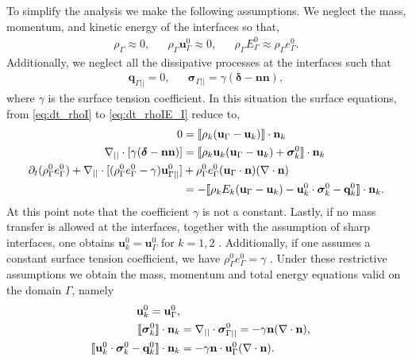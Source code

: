 To simplify the analysis we make the following assumptions. 
We neglect the mass, momentum, and kinetic energy of the interfaces so that,
\begin{align*}
    \rho_\Gamma \approx 0,
    &&
    \rho_\Gamma \textbf{u}_\Gamma^0 \approx 0,
    &&
    \rho_\Gamma E_\Gamma^0 \approx \rho_\Gamma e_\Gamma^0. 
\end{align*}
Additionally, we neglect all the dissipative processes at the interfaces such that
\begin{align*}
    \textbf{q}_{\Gamma||} = 0,
    &&
    \bm\sigma_{\Gamma||} = \gamma (\bm\delta  - \textbf{nn}),
\end{align*}
where $\gamma$ is the surface tension coefficient. 
In this situation the surface equations, from \ref{eq:dt_rhoI} to \ref{eq:dt_rhoIE_I} reduce to, 
\begin{align}
    0&= 
    \llbracket 
        \rho_k (\textbf{u}_\Gamma - \textbf{u}_k)
     \rrbracket \cdot \textbf{n}_k
    \\
    \mathbf{\nabla}_{||}\cdot [\gamma ( \bm\delta - \textbf{nn})]
    &= 
    \llbracket 
        \rho_k \textbf{u}_k (\textbf{u}_\Gamma - \textbf{u}_k)
        + \bm\sigma^0_k
     \rrbracket \cdot \textbf{n}_k
    \\
    \partial_t (\rho_\Gamma^0e_\Gamma^0)  
    + \mathbf{\nabla}_{||}\cdot [
        (\rho_\Gamma^0 e_\Gamma^0 - \gamma)
         \textbf{u}_{\Gamma||}^0
        ]
    &+ \rho_\Gamma^0e_\Gamma^0  (\textbf{u}_\Gamma \cdot \textbf{n})(\mathbf{\nabla}\cdot \textbf{n})\\
    &= 
    -\llbracket 
        \rho_k E_k (\textbf{u}_\Gamma - \textbf{u}_k)
        - \textbf{u}_k^0 \cdot \bm{\sigma}_k^0 - \textbf{q}_k^0
     \rrbracket \cdot \textbf{n}_k. 
\end{align} 
At this point note that the coefficient $\gamma$ is not a constant. 
Lastly, if no mass transfer is allowed at the interfaces, together with the assumption of sharp interfaces, one obtains $\textbf{u}_k^0 = \textbf{u}_\Gamma^0$ for $k = 1,2$ \citep[chapter 2]{tryggvason2011direct}. 
Additionally, if one assumes a constant surface tension coefficient, we have $\rho_\Gamma^0 e_\Gamma^0 = \gamma$ \citep{ishii2010thermo}.  
Under these restrictive assumptions we obtain the mass, momentum and total energy equations valid on the domain $\Gamma$, namely
\begin{align}
    \label{eq:dt_rho_I}
    \textbf{u}_k^0 = \textbf{u}_\Gamma^0, \\
    \Jump{\bm{\sigma}_k^0} 
    &=
    \divI\bm\sigma^0_{\Gamma||}
    =
    -\gamma\textbf{n}(\div \textbf{n}),
    \label{eq:surface_tension}\\
    \label{eq:dt_rhoI_EI}
    \Jump{\textbf{u}_k^0 \cdot \bm{\sigma}_k^0 - \textbf{q}_k^0}
    &=
    -\gamma\textbf{n}\cdot \textbf{u}_{\Gamma}^0(\div \textbf{n}).
\end{align}
